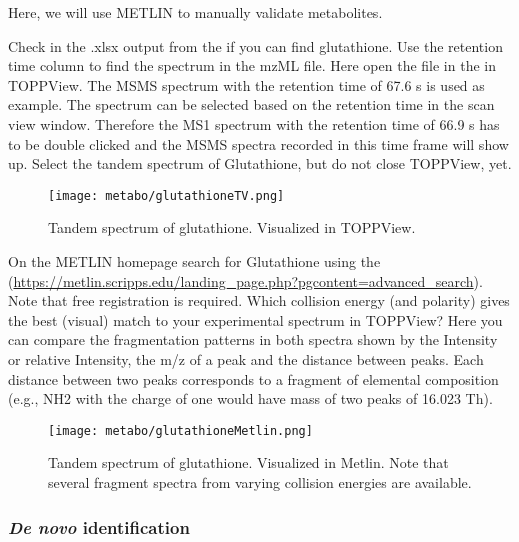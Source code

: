 Here, we will use METLIN to manually validate metabolites.

\begin{task}
Check in the .xlsx output from the  if you can find glutathione. Use the retention time column to find the spectrum in the mzML file. Here open the file in the  in  TOPPView. The MSMS spectrum with the retention time of 67.6 s is used as example. The spectrum can be selected based on the retention time in the scan view window. Therefore the MS1 spectrum with the retention time of 66.9 s has to be double clicked and the MSMS spectra recorded in this time frame will show up. Select the tandem spectrum of Glutathione, but do not close TOPPView, yet.
\end{task} 

\begin{figure}[htbp]
  \centering
  \texttt{[image: metabo/glutathioneTV.png]}
  \caption{Tandem spectrum of glutathione. Visualized in TOPPView.}
  \label{fig:glutathioneTandemSpectrum}
\end{figure}

\begin{task}
On the METLIN homepage search for  Glutathione using the  (\url{https://metlin.scripps.edu/landing_page.php?pgcontent=advanced_search}). Note that free registration is required. Which collision energy (and polarity) gives the best (visual) match to your experimental spectrum in TOPPView? Here you can compare the fragmentation patterns in both spectra shown by the Intensity or relative Intensity, the m/z of a peak and the distance between peaks. Each distance between two peaks corresponds to a fragment of elemental composition (e.g., NH2 with the charge of one would have mass of two peaks of 16.023 Th).
\end{task}

\begin{figure}[htbp]
  \centering
  \texttt{[image: metabo/glutathioneMetlin.png]}
  \caption{Tandem spectrum of glutathione. Visualized in Metlin. Note that several fragment spectra from varying collision energies are available.}
  \label{fig:glutathioneMetlin}
\end{figure}

\subsubsection{\protect\textit{De novo} identification}

